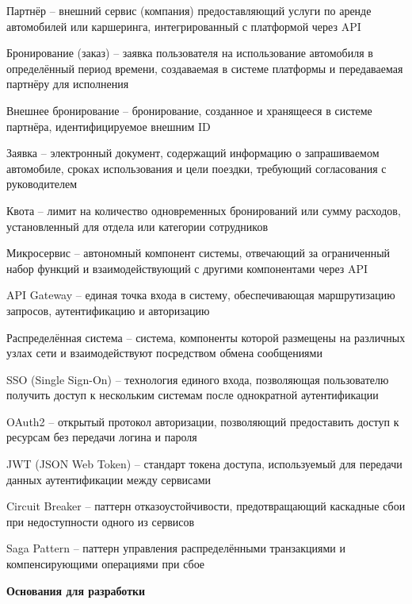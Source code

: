 \documentclass{bmstu}
\begin{document}
\begin{description}

\item Партнёр -- внешний сервис (компания) предоставляющий услуги по аренде автомобилей или каршеринга, интегрированный с платформой через API
\item Бронирование (заказ) -- заявка пользователя на использование автомобиля в определённый период времени, создаваемая в системе платформы и передаваемая партнёру для исполнения
\item Внешнее бронирование -- бронирование, созданное и хранящееся в системе партнёра, идентифицируемое внешним ID
\item Заявка -- электронный документ, содержащий информацию о запрашиваемом автомобиле, сроках использования и цели поездки, требующий согласования с руководителем
\item Квота -- лимит на количество одновременных бронирований или сумму расходов, установленный для отдела или категории сотрудников
\item Микросервис -- автономный компонент системы, отвечающий за ограниченный набор функций и взаимодействующий с другими компонентами через API
\item API Gateway -- единая точка входа в систему, обеспечивающая маршрутизацию запросов, аутентификацию и авторизацию
\item Распределённая система -- система, компоненты которой размещены на различных узлах сети и взаимодействуют посредством обмена сообщениями
\item SSO (Single Sign-On) -- технология единого входа, позволяющая пользователю получить доступ к нескольким системам после однократной аутентификации
\item OAuth2 -- открытый протокол авторизации, позволяющий предоставить доступ к ресурсам без передачи логина и пароля
\item JWT (JSON Web Token) -- стандарт токена доступа, используемый для передачи данных аутентификации между сервисами
\item Circuit Breaker -- паттерн отказоустойчивости, предотвращающий каскадные сбои при недоступности одного из сервисов
\item Saga Pattern -- паттерн управления распределёнными транзакциями и компенсирующими операциями при сбое

\end{description}

\newpage
\begin{center}
    \textbf{Основания для разработки}
\end{center}
\end{document}

